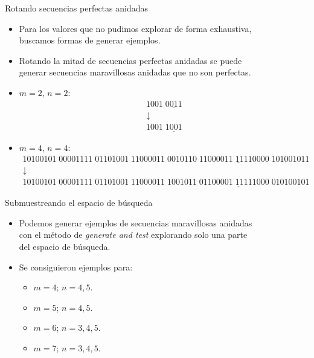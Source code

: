 \documentclass[spanish,xcolor={table}]{beamer}
\begin{document}
\begin{frame}{Rotando secuencias perfectas anidadas}

\begin{itemize}
  \item Para los valores que no pudimos explorar de forma exhaustiva, \\ buscamos formas de generar ejemplos.
  \item Rotando la mitad de secuencias perfectas anidadas se puede \\
  generar secuencias maravillosas anidadas que no son perfectas.
\end{itemize}

\begin{examples}
  \begin{itemize}
		\item $m = 2$, $n = 2$:
		\[
			\begin{array}{c}
				1001\; \underline{0011} \\
				\downarrow \\
				1001\; \underline{1001}
			\end{array}
		\]
		\item $m = 4$, $n = 4$:
		\footnotesize
		\[
			\begin{array}{c}
				10100101\;00001111\;01101001\;11000011\;\underline{0010110\;11000011\;11110000\;101001011} \\
				\downarrow \\
				10100101\;00001111\;01101001\;11000011\;\underline{1001011\;01100001\;11111000\;010100101}
			\end{array}
		\]
  \end{itemize}
\end{examples}
  
\end{frame}



\begin{frame}{Submuestreando el espacio de búsqueda}

  \begin{itemize}
    \item Podemos generar ejemplos de secuencias maravillosas anidadas \\
    con el método de \textit{generate and test} explorando solo una parte \\
    del espacio de búsqueda.
    \item Se consiguieron ejemplos para:
    \begin{itemize}
      \item $m = 4$; $n = 4, 5$.
      \item $m = 5$; $n = 4, 5$.
      \item $m = 6$; $n = 3, 4, 5$.
      \item $m = 7$; $n = 3, 4, 5$.
    \end{itemize}
  \end{itemize}
    
  \end{frame}
\end{document}

